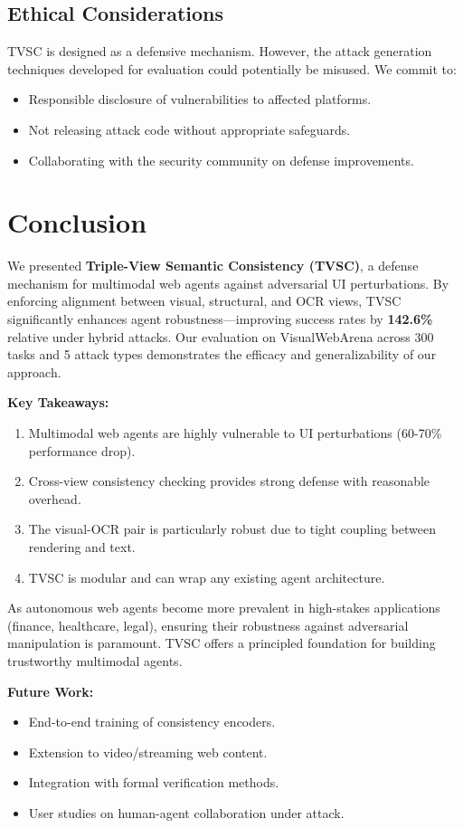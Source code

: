\documentclass[runningheads]{llncs}
\begin{document}
\subsection{Ethical Considerations}
TVSC is designed as a defensive mechanism. However, the attack generation techniques developed for evaluation could potentially be misused. We commit to:
\begin{itemize}
    \item Responsible disclosure of vulnerabilities to affected platforms.
    \item Not releasing attack code without appropriate safeguards.
    \item Collaborating with the security community on defense improvements.
\end{itemize}

\section{Conclusion}

We presented \textbf{Triple-View Semantic Consistency (TVSC)}, a defense mechanism for multimodal web agents against adversarial UI perturbations. By enforcing alignment between visual, structural, and OCR views, TVSC significantly enhances agent robustness---improving success rates by \textbf{142.6\%} relative under hybrid attacks. Our evaluation on VisualWebArena across 300 tasks and 5 attack types demonstrates the efficacy and generalizability of our approach.

\textbf{Key Takeaways:}
\begin{enumerate}
    \item Multimodal web agents are highly vulnerable to UI perturbations (60-70\% performance drop).
    \item Cross-view consistency checking provides strong defense with reasonable overhead.
    \item The visual-OCR pair is particularly robust due to tight coupling between rendering and text.
    \item TVSC is modular and can wrap any existing agent architecture.
\end{enumerate}

As autonomous web agents become more prevalent in high-stakes applications (finance, healthcare, legal), ensuring their robustness against adversarial manipulation is paramount. TVSC offers a principled foundation for building trustworthy multimodal agents.

\textbf{Future Work:}
\begin{itemize}
    \item End-to-end training of consistency encoders.
    \item Extension to video/streaming web content.
    \item Integration with formal verification methods.
    \item User studies on human-agent collaboration under attack.
\end{itemize}
\end{document}
